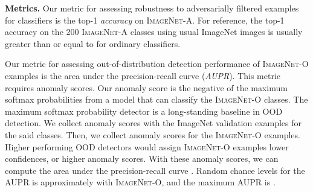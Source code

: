 \documentclass[10pt,twocolumn,letterpaper]{article}
\begin{document}
\noindent\textbf{Metrics.} Our metric for assessing robustness to adversarially filtered examples for classifiers is the top-1 \emph{accuracy} on \textsc{ImageNet-A}. For reference, the top-1 accuracy on the 200 \textsc{ImageNet-A} classes using usual ImageNet images is usually greater than or equal to  for ordinary classifiers.

Our metric for assessing out-of-distribution detection performance of \textsc{ImageNet-O} examples is the area under the precision-recall curve (\emph{AUPR}). This metric requires anomaly scores. Our anomaly score is the negative of the maximum softmax probabilities \cite{hendrycks17baseline} from a model that can classify the  \textsc{ImageNet-O} classes. The maximum softmax probability detector is a long-standing baseline in OOD detection. We collect anomaly scores with the ImageNet validation examples for the said  classes.
Then, we collect anomaly scores for the \textsc{ImageNet-O} examples. Higher performing OOD detectors would assign \textsc{ImageNet-O} examples lower confidences, or higher anomaly scores. With these anomaly scores, we can compute the area under the precision-recall curve \cite{auprbaseline}. Random chance levels for the AUPR is approximately  with \textsc{ImageNet-O}, and the maximum AUPR is .
\end{document}

